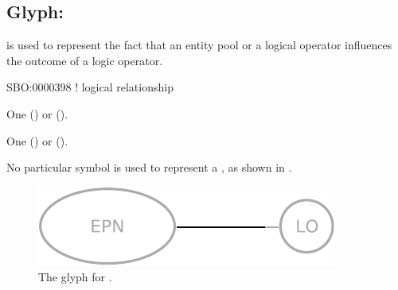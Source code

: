\subsection{Glyph: }
\label{sec:logicArc}

 is used to represent the fact that an entity pool or a logical operator influences
the outcome of a logic operator.

\begin{glyphDescription}

\glyphSboTerm
SBO:0000398 ! logical relationship

\glyphOrigin
One  () or  ().

\glyphTarget
One  () or  ().

\glyphSymbol
No particular symbol is used to represent a , as shown in .

\end{glyphDescription}

\begin{figure}[H]
  \centering
  \includegraphics{images/logicArc}
  \caption{The \PD glyph for .}
  \label{fig:logicArc}
\end{figure}
